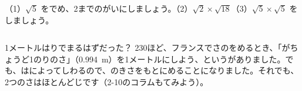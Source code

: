 \begin{jibun}
（1）$\sqrt{5}$ をでめ、2までのがいにしましょう。（2）$\sqrt{2}\times\sqrt{18}$\quad（3）$\sqrt{5}\times\sqrt{5}$ をしましょう。
\end{jibun}

\begin{column}{1メートルはりでまるはずだった？}
230ほど、フランスでさのをめるとき、「がちょうど1のりのさ」（\qty{0.994}{m}）を1メートルにしよう、というがありました。でも、はによってしわるので、のきさをもとにめることになりました。それでも、2つのさはほとんどじです（2-10のコラムもてみよう）。
\end{column}

